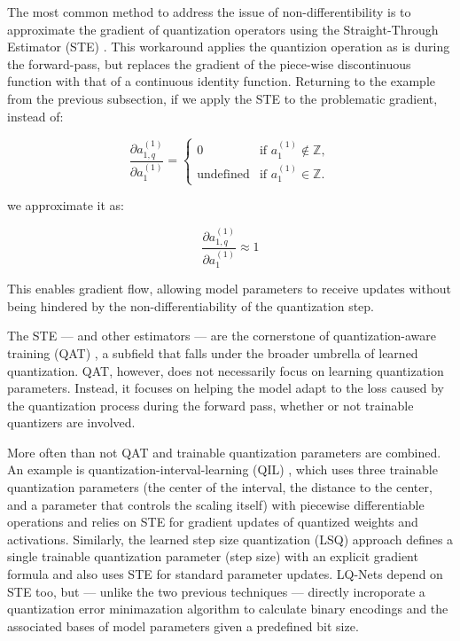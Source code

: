 \hspace*{1em}The most common method to address the issue of non-differentibility is to approximate the gradient of quantization operators
using the Straight-Through Estimator (STE) \cite{bengio2013estimating} \cite{fan2021training} \cite{DBLP:conf/eccv/ZhangYYH18}. This workaround applies the quantizion operation as is 
during the forward-pass, but replaces the gradient of the piece-wise discontinuous function 
with that of a continuous identity function. Returning to the example from the previous subsection,
if we apply the STE to the problematic gradient, instead of:

\[
  \frac{\partial a_{1,q}^{(1)}}{\partial a_{1}^{(1)}} =
  \begin{cases} 
      0 & \text{if } a_{1}^{(1)} \notin \mathbb{Z}, \\
      \text{undefined} & \text{if } a_{1}^{(1)} \in \mathbb{Z}.
  \end{cases}
  \]

we approximate it as: 

\[
  \frac{\partial a_{1,q}^{(1)}}{\partial a_{1}^{(1)}}  \approx 1
  \]

This enables gradient flow, allowing model parameters to receive updates
without being hindered by the non-differentiability of the quantization step.

The STE — and other estimators \cite{DBLP:journals/jstsp/Chen0ZHY20} —  are the cornerstone of quantization-aware training (QAT) \cite{jacob2018quantization},
a subfield that falls under the broader umbrella of learned quantization.
QAT, however, does not necessarily focus on learning quantization parameters.
Instead, it focuses on helping the model adapt to the loss caused by the quantization process during the forward pass,
whether or not trainable quantizers are involved.

More often than not QAT and trainable quantization parameters are combined. 
An example is quantization-interval-learning (QIL) \cite{DBLP:conf/cvpr/JungSLSHKHC19}, 
which uses three trainable quantization parameters 
(the center of the interval, the distance to the center, and a parameter that controls the scaling itself) 
with piecewise differentiable operations and relies on STE for gradient updates of quantized weights and activations. 
Similarly, the learned step size quantization (LSQ) approach \cite{DBLP:conf/iclr/EsserMBAM20} 
defines a single trainable quantization parameter (step size) with an explicit gradient formula and also uses STE for standard parameter updates.
LQ-Nets \cite{DBLP:conf/eccv/ZhangYYH18} depend on STE too, but  —  unlike the two previous techniques — 
directly incroporate a quantization error minimazation algorithm to calculate binary encodings and the associated bases of
model parameters given a predefined bit size. 

